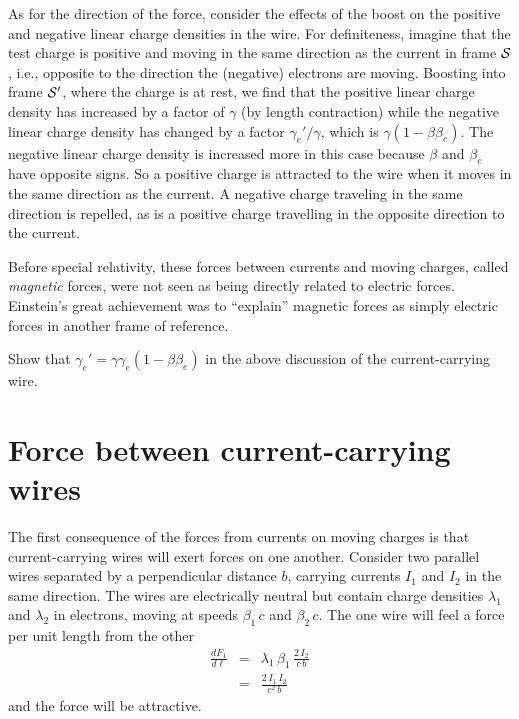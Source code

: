 As for the direction of the force, consider the effects of the boost
on the positive and negative linear charge densities in the wire.  For
definiteness, imagine that the test charge is positive and moving in
the same direction as the current in frame $\cal S$, i.e., opposite
to the direction the (negative) electrons are moving.  Boosting into
frame $\cal S'$, where the charge is at rest, we find that the
positive linear charge density has increased by a factor of $\gamma$
(by length contraction) while the negative linear charge density has
changed by a factor $\gamma_e'/\gamma$, which is
$\gamma(1-\beta\beta_e)$.  The negative linear charge density is
increased more in this case because $\beta$ and $\beta_e$ have
opposite signs.  So a positive charge is attracted to the wire when it
moves in the same direction as the current.  A negative charge
traveling in the same direction is repelled, as is a positive charge
travelling in the opposite direction to the current.

Before special relativity, these forces between currents and moving
charges, called {\em magnetic\/} forces, were not seen as being
directly related to electric forces.  Einstein's great achievement was
to ``explain'' magnetic forces as simply electric forces in another
frame of reference.

\begin{problem}
Show that $\gamma_e'=\gamma\gamma_e(1-\beta\beta_e)$ in the above
discussion of the current-carrying wire.
\end{problem}


\section{Force between current-carrying wires}

The first consequence of the forces from currents on moving charges is
that current-carrying wires will exert forces on one another.
Consider two parallel wires separated by a perpendicular distance $b$,
carrying currents $I_1$ and $I_2$ in the same direction.  The wires
are electrically neutral but contain charge densities $\lambda_1$ and
$\lambda_2$ in electrons, moving at speeds $\beta_1\,c$ and
$\beta_2\,c$.  The one wire will feel a force per unit length from the
other
\begin{eqnarray}
\frac{dF_1}{d\ell} & = & \lambda_1\,\beta_1\,\frac{2\,I_2}{c\,b} \nonumber \\
 & = & \frac{2\,I_1\,I_2}{c^2\,b}
\end{eqnarray}
and the force will be attractive.

